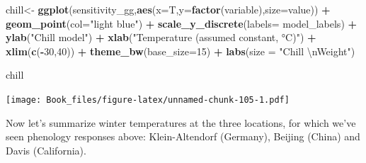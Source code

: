 \documentclass[
]{book}
\newenvironment{Shaded}{\begin{snugshade}}{\end{snugshade}}
\newcommand{\CharTok}[1]{\textcolor[rgb]{0.31,0.60,0.02}{#1}}
\newcommand{\DataTypeTok}[1]{\textcolor[rgb]{0.13,0.29,0.53}{#1}}
\newcommand{\DecValTok}[1]{\textcolor[rgb]{0.00,0.00,0.81}{#1}}
\newcommand{\KeywordTok}[1]{\textcolor[rgb]{0.13,0.29,0.53}{\textbf{#1}}}
\newcommand{\NormalTok}[1]{#1}
\newcommand{\OperatorTok}[1]{\textcolor[rgb]{0.81,0.36,0.00}{\textbf{#1}}}
\newcommand{\StringTok}[1]{\textcolor[rgb]{0.31,0.60,0.02}{#1}}
\begin{document}
\begin{Shaded}
\begin{Highlighting}[]
\NormalTok{chill<-}
\StringTok{  }\KeywordTok{ggplot}\NormalTok{(sensitivity_gg,}\KeywordTok{aes}\NormalTok{(}\DataTypeTok{x=}\NormalTok{T,}\DataTypeTok{y=}\KeywordTok{factor}\NormalTok{(variable),}\DataTypeTok{size=}\NormalTok{value)) }\OperatorTok{+}
\StringTok{  }\KeywordTok{geom_point}\NormalTok{(}\DataTypeTok{col=}\StringTok{"light blue"}\NormalTok{) }\OperatorTok{+}
\StringTok{  }\KeywordTok{scale_y_discrete}\NormalTok{(}\DataTypeTok{labels=}\NormalTok{ model_labels) }\OperatorTok{+}
\StringTok{  }\KeywordTok{ylab}\NormalTok{(}\StringTok{"Chill model"}\NormalTok{) }\OperatorTok{+}
\StringTok{  }\KeywordTok{xlab}\NormalTok{(}\StringTok{"Temperature (assumed constant, °C)"}\NormalTok{) }\OperatorTok{+}
\StringTok{  }\KeywordTok{xlim}\NormalTok{(}\KeywordTok{c}\NormalTok{(}\OperatorTok{-}\DecValTok{30}\NormalTok{,}\DecValTok{40}\NormalTok{)) }\OperatorTok{+}
\StringTok{  }\KeywordTok{theme_bw}\NormalTok{(}\DataTypeTok{base_size=}\DecValTok{15}\NormalTok{) }\OperatorTok{+}
\StringTok{  }\KeywordTok{labs}\NormalTok{(}\DataTypeTok{size =} \StringTok{"Chill }\CharTok{\textbackslash{}n}\StringTok{Weight"}\NormalTok{)}
\end{Highlighting}
\end{Shaded}

\begin{Shaded}
\begin{Highlighting}[]
\NormalTok{chill}
\end{Highlighting}
\end{Shaded}

\texttt{[image: Book\_files/figure-latex/unnamed-chunk-105-1.pdf]}

Now let's summarize winter temperatures at the three locations, for which we've seen phenology responses above: Klein-Altendorf (Germany), Beijing (China) and Davis (California).
\end{document}
